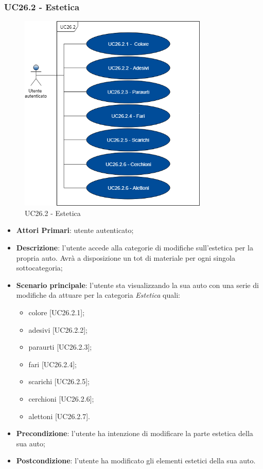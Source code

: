 \subsubsection{UC26.2 - Estetica}
\begin{figure}[h]
	\includegraphics[width=9cm]{res/images/UC26-2Estetica.png}
	\centering
	\caption{UC26.2 - Estetica}
\end{figure}
\begin{itemize}
	\item \textbf{Attori Primari}: utente autenticato;
	\item \textbf{Descrizione}: l'utente accede alla categorie di modifiche sull'estetica per la propria auto. Avrà a disposizione un tot di materiale per ogni singola sottocategoria;
	\item \textbf{Scenario principale}: l'utente sta visualizzando la sua auto con una serie di modifiche da attuare per la categoria \textit{Estetica} quali:
	\begin{itemize}
		\item colore [UC26.2.1];
		\item adesivi [UC26.2.2];
		\item paraurti [UC26.2.3];
		\item fari [UC26.2.4];
		\item scarichi [UC26.2.5];
		\item cerchioni [UC26.2.6];
		\item alettoni [UC26.2.7].
	\end{itemize}
	\item \textbf{Precondizione}: l'utente ha intenzione di modificare la parte estetica della sua auto;
	\item \textbf{Postcondizione}: l'utente ha modificato gli elementi estetici della sua auto.
\end{itemize}


